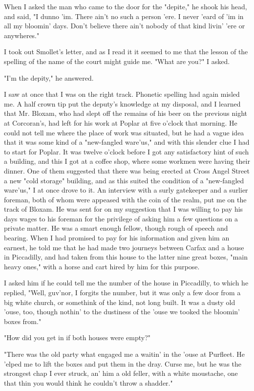When I asked the man who came to the door for the "depite," he shook his head, and said, "I dunno 'im. There ain't no such a person 'ere. I never 'eard of 'im in all my bloomin' days. Don't believe there ain't nobody of that kind livin' 'ere or anywheres." 

I took out Smollet's letter, and as I read it it seemed to me that the lesson of the spelling of the name of the court might guide me. "What are you?" I asked. 

"I'm the depity," he answered. 

I saw at once that I was on the right track. Phonetic spelling had again misled me. A half crown tip put the deputy's knowledge at my disposal, and I learned that Mr. Bloxam, who had slept off the remains of his beer on the previous night at Corcoran's, had left for his work at Poplar at five o'clock that morning. He could not tell me where the place of work was situated, but he had a vague idea that it was some kind of a "new-fangled ware'us," and with this slender clue I had to start for Poplar. It was twelve o'clock before I got any satisfactory hint of such a building, and this I got at a coffee shop, where some workmen were having their dinner. One of them suggested that there was being erected at Cross Angel Street a new "cold storage" building, and as this suited the condition of a "new-fangled ware'us," I at once drove to it. An interview with a surly gatekeeper and a surlier foreman, both of whom were appeased with the coin of the realm, put me on the track of Bloxam. He was sent for on my suggestion that I was willing to pay his days wages to his foreman for the privilege of asking him a few questions on a private matter. He was a smart enough fellow, though rough of speech and bearing. When I had promised to pay for his information and given him an earnest, he told me that he had made two journeys between Carfax and a house in Piccadilly, and had taken from this house to the latter nine great boxes, "main heavy ones," with a horse and cart hired by him for this purpose. 

I asked him if he could tell me the number of the house in Piccadilly, to which he replied, "Well, guv'nor, I forgits the number, but it was only a few door from a big white church, or somethink of the kind, not long built. It was a dusty old 'ouse, too, though nothin' to the dustiness of the 'ouse we tooked the bloomin' boxes from." 

"How did you get in if both houses were empty?" 

"There was the old party what engaged me a waitin' in the 'ouse at Purfleet. He 'elped me to lift the boxes and put them in the dray. Curse me, but he was the strongest chap I ever struck, an' him a old feller, with a white moustache, one that thin you would think he couldn't throw a shadder." 

